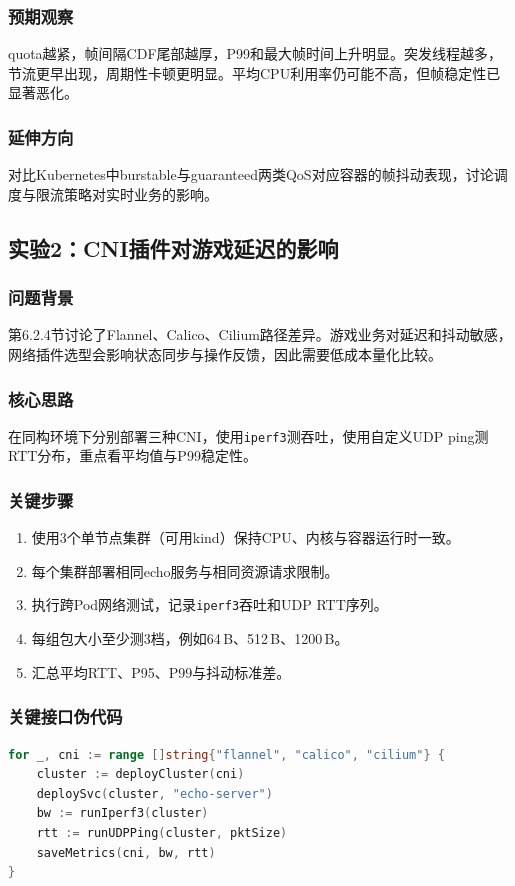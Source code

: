 \subsubsection{预期观察}
quota越紧，帧间隔CDF尾部越厚，P99和最大帧时间上升明显。突发线程越多，节流更早出现，周期性卡顿更明显。平均CPU利用率仍可能不高，但帧稳定性已显著恶化。

\subsubsection{延伸方向}
对比Kubernetes中burstable与guaranteed两类QoS对应容器的帧抖动表现，讨论调度与限流策略对实时业务的影响。

\subsection{实验2：CNI插件对游戏延迟的影响}

\subsubsection{问题背景}
第6.2.4节讨论了Flannel、Calico、Cilium路径差异。游戏业务对延迟和抖动敏感，网络插件选型会影响状态同步与操作反馈，因此需要低成本量化比较。

\subsubsection{核心思路}
在同构环境下分别部署三种CNI，使用\texttt{iperf3}测吞吐，使用自定义UDP ping测RTT分布，重点看平均值与P99稳定性。

\subsubsection{关键步骤}
\begin{enumerate}
\item 使用3个单节点集群（可用kind）保持CPU、内核与容器运行时一致。
\item 每个集群部署相同echo服务与相同资源请求限制。
\item 执行跨Pod网络测试，记录\texttt{iperf3}吞吐和UDP RTT序列。
\item 每组包大小至少测3档，例如64\,B、512\,B、1200\,B。
\item 汇总平均RTT、P95、P99与抖动标准差。
\end{enumerate}

\subsubsection{关键接口伪代码}
\begin{tcolorbox}[title=CNI对比测试流程]
\begin{lstlisting}[style=codeblock, language=go]
for _, cni := range []string{"flannel", "calico", "cilium"} {
    cluster := deployCluster(cni)
    deploySvc(cluster, "echo-server")
    bw := runIperf3(cluster)
    rtt := runUDPPing(cluster, pktSize)
    saveMetrics(cni, bw, rtt)
}
\end{lstlisting}
\end{tcolorbox}

